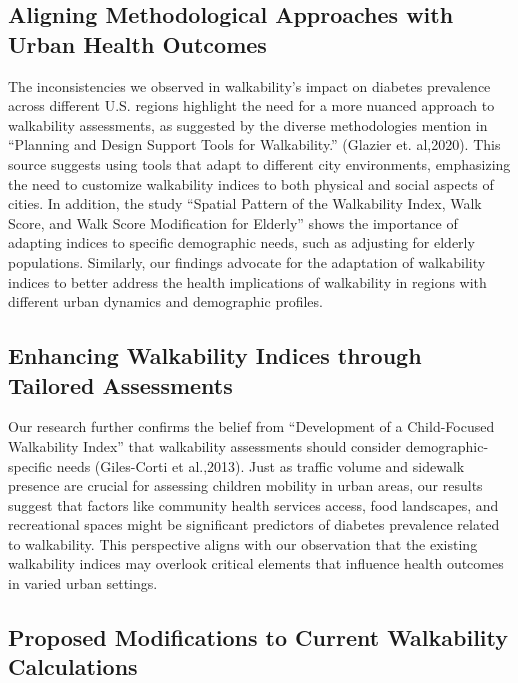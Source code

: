\documentclass[
]{article}
\begin{document}
\subsection{Aligning Methodological Approaches with Urban Health
Outcomes}\label{aligning-methodological-approaches-with-urban-health-outcomes}

The inconsistencies we observed in walkability's impact on diabetes
prevalence across different U.S. regions highlight the need for a more
nuanced approach to walkability assessments, as suggested by the diverse
methodologies mention in ``Planning and Design Support Tools for
Walkability.'' (Glazier et. al,2020). This source suggests using tools
that adapt to different city environments, emphasizing the need to
customize walkability indices to both physical and social aspects of
cities. In addition, the study ``Spatial Pattern of the Walkability
Index, Walk Score, and Walk Score Modification for Elderly'' shows the
importance of adapting indices to specific demographic needs, such as
adjusting for elderly populations. Similarly, our findings advocate for
the adaptation of walkability indices to better address the health
implications of walkability in regions with different urban dynamics and
demographic profiles.

\subsection{Enhancing Walkability Indices through Tailored
Assessments}\label{enhancing-walkability-indices-through-tailored-assessments}

Our research further confirms the belief from ``Development of a
Child-Focused Walkability Index'' that walkability assessments should
consider demographic-specific needs (Giles-Corti et al.,2013). Just as
traffic volume and sidewalk presence are crucial for assessing children
mobility in urban areas, our results suggest that factors like community
health services access, food landscapes, and recreational spaces might
be significant predictors of diabetes prevalence related to walkability.
This perspective aligns with our observation that the existing
walkability indices may overlook critical elements that influence health
outcomes in varied urban settings.

\subsection{Proposed Modifications to Current Walkability
Calculations}\label{proposed-modifications-to-current-walkability-calculations}
\end{document}

